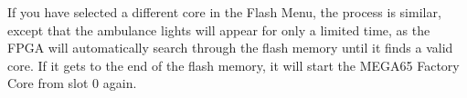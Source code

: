 If you have selected a different core in the Flash Menu, the process
is similar, except that the ambulance lights will appear for only a
limited time, as the FPGA will automatically search through the flash
memory until it finds a valid core. If it gets to the end of the flash
memory, it will start the MEGA65 Factory Core from slot 0 again.




